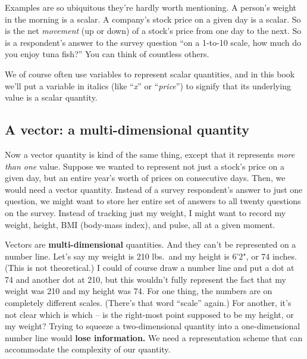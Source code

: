 

Examples are so ubiquitous they're hardly worth mentioning. A person's weight
in the morning is a scalar. A company's stock price on a given day is a scalar.
So is the net \textit{movement} (up or down) of a stock's price from one day to
the next. So is a respondent's answer to the survey question ``on a 1-to-10
scale, how much do you enjoy tuna fish?'' You can think of countless others.

We of course often use variables to represent scalar quantities, and in this
book we'll put a variable in italics (like ``\textit{x}'' or
``\textit{price}'') to signify that its underlying value is a scalar quantity.

\subsection{A vector: a multi-dimensional quantity}

Now a vector quantity is kind of the same thing, except that it represents
\textit{more than one} value. Suppose we wanted to represent not just a stock's
price on a given day, but an entire year's worth of prices on consecutive days.
Then, we would need a vector quantity. Instead of a survey respondent's answer
to just one question, we might want to store her entire set of answers to all
twenty questions on the survey. Instead of tracking just my weight, I might
want to record my weight, height, BMI (body-mass index), and pulse, all at a
given moment.


Vectors are \textbf{multi-dimensional} quantities. And they can't be
represented on a number line. Let's say my weight is 210 lbs.~and my height is
6'2", or 74 inches. (This is not theoretical.) I could of course draw a number
line and put a dot at 74 and another dot at 210, but this wouldn't fully
represent the fact that my weight was 210 and my height was 74. For one thing,
the numbers are on completely different scales. (There's that word ``scale''
again.) For another, it's not clear which is which -- is the right-most point
supposed to be my height, or my weight? Trying to squeeze a two-dimensional
quantity into a one-dimensional number line would \textbf{lose information.}
We need a representation scheme that can accommodate the complexity of our
quantity.

